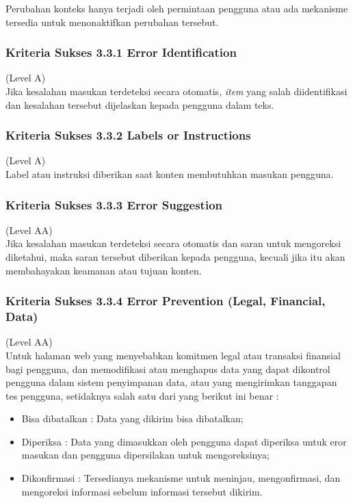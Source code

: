 \documentclass[a4paper,twoside]{article}
\begin{document}
\begin{enumerate}
		Perubahan konteks hanya terjadi oleh permintaan pengguna atau ada mekanisme tersedia untuk menonaktifkan perubahan tersebut.
		
		\subsubsection*{Kriteria Sukses 3.3.1 Error Identification}
		\label{subsubsec:kriteria_3.3.1}
		(Level A) \\
		
		Jika kesalahan masukan terdeteksi secara otomatis, \textit{item} yang salah diidentifikasi dan kesalahan tersebut dijelaskan kepada pengguna dalam teks.
		
		\subsubsection*{Kriteria Sukses 3.3.2 Labels or Instructions}
		\label{subsubsec:kriteria_3.3.2}
		(Level A) \\
		
		Label atau instruksi diberikan saat konten membutuhkan masukan pengguna.
		
		\subsubsection*{Kriteria Sukses 3.3.3 Error Suggestion}
		\label{subsubsec:kriteria_3.3.3}
		(Level AA) \\
		
		Jika kesalahan masukan terdeteksi secara otomatis dan saran untuk mengoreksi diketahui, maka saran tersebut diberikan kepada pengguna, kecuali jika itu akan membahayakan keamanan atau tujuan konten.
		
		\subsubsection*{Kriteria Sukses 3.3.4 Error Prevention (Legal, Financial, Data)}
		\label{subsubsec:kriteria_3.3.4}
		(Level AA) \\
		
		Untuk halaman web yang menyebabkan komitmen legal atau transaksi finansial bagi pengguna, dan memodifikasi atau menghapus data yang dapat dikontrol pengguna dalam sistem penyimpanan data, atau yang mengirimkan tanggapan tes pengguna, setidaknya salah satu dari yang berikut ini benar :
		
		\begin{itemize}
			\item Bisa dibatalkan : Data yang dikirim bisa dibatalkan;
			\item Diperiksa : Data yang dimasukkan oleh pengguna dapat diperiksa untuk eror masukan dan pengguna dipersilakan untuk mengoreksinya;
			\item Dikonfirmasi : Tersedianya mekanisme untuk meninjau, mengonfirmasi, dan mengoreksi informasi sebelum informasi tersebut dikirim.
		\end{itemize}
		

\end{enumerate}
\end{document}

